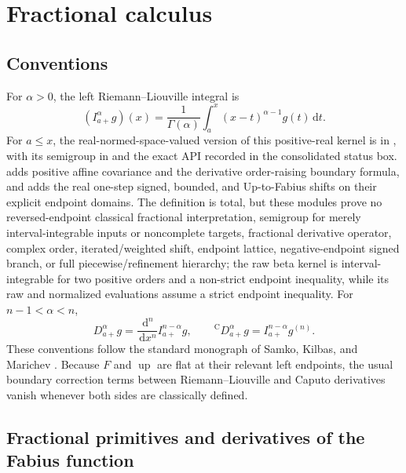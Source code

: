 \documentclass[11pt,oneside]{article}
\theoremstyle{definition}
\theoremstyle{remark}
\newcommand{\Up}{\operatorname{up}}
\newcommand{\dd}{\,\mathrm d}
\newcommand{\1}{\mathbf 1}
\begin{document}
\section{Fractional calculus}
\label{p8:sec:fractional}

\subsection{Conventions}

For \(\alpha>0\), the left Riemann--Liouville integral is
\begin{equation}
 (I_{a+}^{\alpha}g)(x)
 =\frac1{\Gamma(\alpha)}\int_a^x(x-t)^{\alpha-1}g(t)\dd t.
 \label{p8:eq:RL-definition}
\end{equation}
For \(a\le x\), the real-normed-space-valued version of this positive-real kernel is
 in , with its semigroup
in  and the exact API recorded in the
consolidated status box.   adds positive
affine covariance and the derivative order-raising boundary formula, and
 adds the real one-step signed, bounded, and
Up-to-Fabius shifts on their explicit endpoint domains.  The definition is total, but these
modules prove no reversed-endpoint classical fractional interpretation, semigroup for merely
interval-integrable inputs or noncomplete targets, fractional derivative operator, complex
order, iterated/weighted shift, endpoint lattice, negative-endpoint signed branch, or full
piecewise/refinement hierarchy; the raw beta kernel is interval-integrable for two positive
orders and a non-strict endpoint inequality, while its raw and normalized evaluations assume
a strict endpoint inequality.
For \(n-1<\alpha<n\),
\begin{equation}
 D_{a+}^{\alpha}g=\frac{\dd^n}{\dd x^n}I_{a+}^{n-\alpha}g,
 \qquad
 {}^{\mathrm C}D_{a+}^{\alpha}g=I_{a+}^{n-\alpha}g^{(n)}.
 \label{p8:eq:RL-Caputo}
\end{equation}
These conventions follow the standard monograph of Samko, Kilbas, and Marichev
\cite{p8:samko}.  Because \(F\) and \(\Up\) are flat at their relevant left
endpoints, the usual boundary correction terms between Riemann--Liouville and
Caputo derivatives vanish whenever both sides are classically defined.

\subsection{Fractional primitives and derivatives of the Fabius function}
\end{document}
